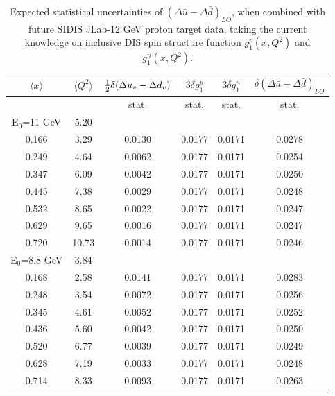 \begin{table}[h]
\begin{center}
\begin{tabular}{|cc|c|cc||c|}
\hline
$\langle x \rangle $ &  $\langle Q^2 \rangle $  & ${1 \over 2} \delta (\Delta u_v - \Delta d_v)$  & $3 \delta g_1^p$ & $3  \delta g_1^n$ & $\delta \left( \Delta \bar{u} - \Delta \bar{d} \right)_{LO}$  \\  \hline
       & & stat. & stat. & stat. & stat.  \\ 
  E$_0$=11 GeV &  5.20   &    &   &   &    \\
   0.166 &    3.29 &   0.0130 &  0.0177 &   0.0171 &    0.0278 \\
   0.249 &    4.64 &   0.0062 &  0.0177 &   0.0171 &    0.0254 \\
   0.347 &    6.09 &   0.0042 &  0.0177 &   0.0171 &    0.0250 \\
   0.445 &    7.38 &   0.0029 &  0.0177 &   0.0171 &    0.0248 \\
   0.532 &    8.65 &   0.0022 &  0.0177 &   0.0171 &    0.0247 \\
   0.629 &    9.65 &   0.0016 &  0.0177 &   0.0171 &    0.0247 \\
   0.720 &   10.73 &   0.0014 &  0.0177 &   0.0171 &    0.0246 \\
  E$_0$=8.8 GeV &   3.84  &    &   &   &    \\
    0.168 &    2.58 &   0.0141 &  0.0177 &   0.0171 &    0.0283 \\
   0.248 &    3.54 &   0.0072 &  0.0177 &   0.0171 &    0.0256 \\
   0.345 &    4.61 &   0.0052 &  0.0177 &   0.0171 &    0.0252 \\
   0.436 &    5.60 &   0.0042 &  0.0177 &   0.0171 &    0.0250 \\
   0.520 &    6.77 &   0.0039 &  0.0177 &   0.0171 &    0.0249 \\
   0.628 &    7.19 &   0.0033 &  0.0177 &   0.0171 &    0.0248 \\
   0.714 &    8.33 &   0.0093 &  0.0177 &   0.0171 &    0.0263 \\
\hline
\end{tabular}
\end{center}
\caption{\label{tab:pdfstat} Expected statistical uncertainties of  $(\Delta \bar{u} - \Delta \bar{d})_{LO}$, when combined with future SIDIS JLab-12 GeV proton target data,  taking  the current knowledge on inclusive DIS spin structure function $g_1^p(x, Q^2)$ and $g_1^n(x, Q^2)$.
}
\end{table}

